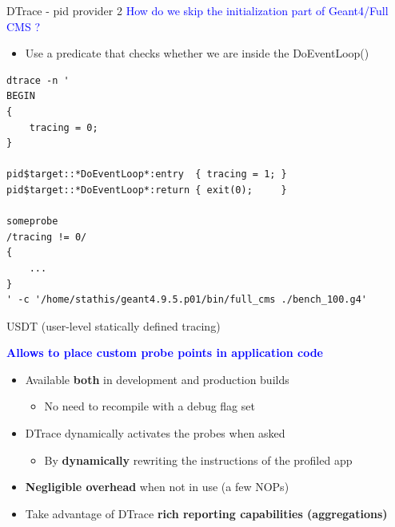 \documentclass{beamer}
\begin{document}
\begin{frame}[fragile]{DTrace - pid provider 2}
\textcolor{blue}{How do we skip the initialization part of Geant4/Full CMS ?}
\begin{itemize}
\item Use a predicate that checks whether we are inside the DoEventLoop()
\end{itemize}

\lstset{frame=single, columns=flexible}
\lstset{basicstyle=\tiny\ttfamily}
\begin{lstlisting}
dtrace -n '
BEGIN
{
    tracing = 0;
}

pid$target::*DoEventLoop*:entry  { tracing = 1; }
pid$target::*DoEventLoop*:return { exit(0);     }

someprobe
/tracing != 0/
{
    ...
}
' -c '/home/stathis/geant4.9.5.p01/bin/full_cms ./bench_100.g4'
\end{lstlisting}

\end{frame}

\begin{frame}{USDT (user-level statically defined tracing)}

{\bf \textcolor{blue}{Allows to place custom probe points in application code}}

\begin{itemize}
	\item Available {\bf both} in development and production builds
	
	\begin{itemize}
		\item No need to recompile with a debug flag set
	\end{itemize}
	
	\item DTrace dynamically activates the probes when asked
	
	\begin{itemize}
		\item By {\bf dynamically} rewriting the instructions of the profiled app
	\end{itemize}

	\item {\bf Negligible overhead} when not in use (a few NOPs)
	
	\item Take advantage of DTrace {\bf rich reporting capabilities (aggregations)}
\end{itemize}

\end{frame}
\end{document}
